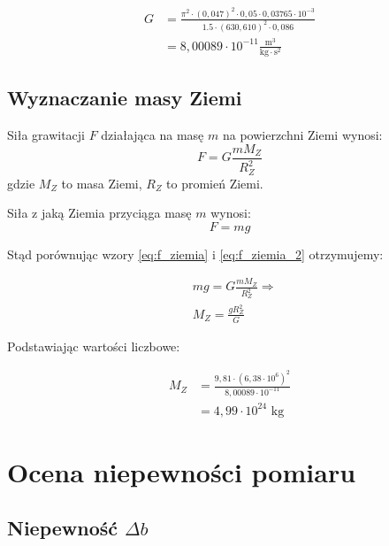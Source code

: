 \documentclass[a4paper,12pt]{article}
\begin{document}
\begin{align*}
    G & = \frac{\pi^2 \cdot (0{,}047)^2 \cdot 0{,}05 \cdot 0{,}03765 \cdot 10^{-3}}{
    1.5 \cdot (630{,}610)^2 \cdot 0{,}086}                                           \\
      & = 8{,}00089 \cdot 10^{-11} \frac{\text{m}^3}{\text{kg} \cdot \text{s}^2}
\end{align*}



\subsection{Wyznaczanie masy Ziemi}


Siła grawitacji $F$ działająca na masę $m$ na powierzchni Ziemi wynosi:
\begin{equation}
    \label{eq:f_ziemia}
    F = G \frac{mM_Z}{R_Z^2}
\end{equation}
gdzie $M_Z$ to masa Ziemi, $R_Z$ to promień Ziemi.

Siła z jaką Ziemia przyciąga masę $m$ wynosi:
\begin{equation}
    \label{eq:f_ziemia_2}
    F = mg
\end{equation}

Stąd porównując wzory \eqref{eq:f_ziemia} i \eqref{eq:f_ziemia_2} otrzymujemy:

\begin{align*}
     & mg = G \frac{mM_Z}{R_Z^2} \Rightarrow \\
     & M_Z = \frac{gR_Z^2}{G}
\end{align*}

Podstawiając wartości liczbowe:

\begin{align*}
    M_Z & = \frac{9{,}81 \cdot (6{,}38 \cdot 10^6)^2}{8{,}00089 \cdot 10^{-11}} \\
        & = 4{,}99 \cdot 10^{24} \text{ kg}
\end{align*}










\section{Ocena niepewności pomiaru}

\subsection{Niepewność $\Delta b$}
\end{document}
